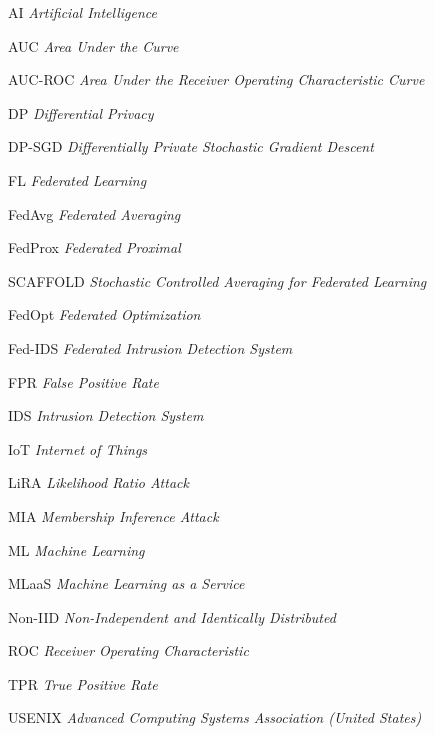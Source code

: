 \documentclass[
	12pt,				%
	openright,			%
	oneside,			%
	a4paper,			%
	english,			%
	french,				%
	spanish,			%
	brazil,				%
	]{abntex2}
\begin{document}
\begin{siglas}
  \item[AI] \textit{Artificial Intelligence}
  \item[AUC] \textit{Area Under the Curve}
  \item[AUC-ROC] \textit{Area Under the Receiver Operating Characteristic Curve}
  \item[DP] \textit{Differential Privacy}
  \item[DP-SGD] \textit{Differentially Private Stochastic Gradient Descent}
  \item[FL] \textit{Federated Learning}
  \item[FedAvg] \textit{Federated Averaging}
  \item[FedProx] \textit{Federated Proximal}
  \item[SCAFFOLD] \textit{Stochastic Controlled Averaging for Federated Learning}
  \item[FedOpt] \textit{Federated Optimization}
  \item[Fed-IDS] \textit{Federated Intrusion Detection System}
  \item[FPR] \textit{False Positive Rate}
  \item[IDS] \textit{Intrusion Detection System}
  \item[IoT] \textit{Internet of Things}
  \item[LiRA] \textit{Likelihood Ratio Attack}
  \item[MIA] \textit{Membership Inference Attack}
  \item[ML] \textit{Machine Learning}
  \item[MLaaS] \textit{Machine Learning as a Service}
  \item[Non-IID] \textit{Non-Independent and Identically Distributed}
  \item[ROC] \textit{Receiver Operating Characteristic}
  \item[TPR] \textit{True Positive Rate}
  \item[USENIX] \textit{Advanced Computing Systems Association (United States)}
\end{siglas}



\end{document}
